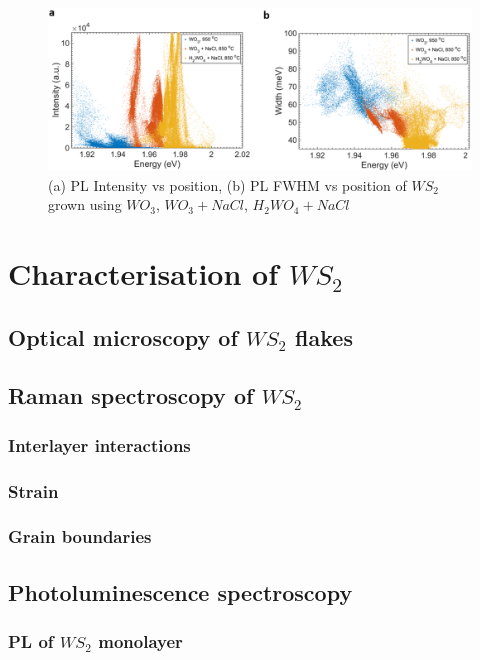 \documentclass[12pt]{article}
\begin{document}
{\begin{figure}[h]
\begin{center}
\includegraphics[scale=0.3]{PaperSIScatterComparison.png}
\caption{(a) PL Intensity vs position, (b) PL FWHM vs position of $WS_2$ grown using $WO_3$, $WO_3+NaCl$, $H_2WO_4+NaCl$}
\label{fig:PaperSIScatterComparison}
\end{center}
\end{figure}


\section{Characterisation of $WS_2$}
	\subsection{Optical microscopy of $WS_2$ flakes}
	\subsection{Raman spectroscopy of $WS_2$}
		\subsubsection{Interlayer interactions}
		\subsubsection{Strain}
		\subsubsection{Grain boundaries}
	\subsection{Photoluminescence spectroscopy}
		\subsubsection{PL of $WS_2$ monolayer}
}
\end{document}
